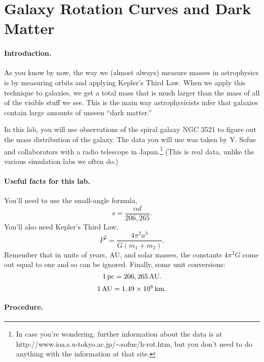 \section{Galaxy Rotation Curves and Dark Matter}

\makelabheader

\paragraph{Introduction.}

As you know by now, the way we (almost always) measure masses
in astrophysics is by measuring orbits and applying Kepler's Third
Law.  When we apply this technique to galaxies, we get a total
mass that is much larger than the mass of all of the visible
stuff we see.  This is the main way astrophysicists infer that
galaxies contain large amounts of unseen ``dark matter.''

In this lab, you will use observations of the spiral
galaxy NGC 3521 to figure out the mass distribution of the galaxy.
The data you will use was taken by Y. Sofue and collaborators
with a radio telescope in Japan.\footnote{In case you're
wondering, further information about the data is at
http://www.ioa.s.u-tokyo.ac.jp/$\sim$sofue/h-rot.htm,  but you don't
need to do anything with the information at that site.}
(This is real data, unlike
the various simulation labs we often do.)  

\paragraph{Useful facts for this lab.}

You'll need to use the small-angle formula,
$$
s=\frac{\alpha d}{206,265}.
$$
You'll also need Kepler's Third Law,
$$
P^2=\frac{4\pi^2a^3}{G(m_1+m_2)}.
$$
Remember that in units of years, AU, and solar masses, the
constants ${4\pi^2}{G}$ come out equal to one and so can
be ignored.  Finally, some unit conversions:
$$
1\,{\rm pc}=206,265\,{\rm AU}.
$$
$$
1\,{\rm AU}=1.49\times 10^8\,{\rm km}.
$$


\paragraph{Procedure.}

